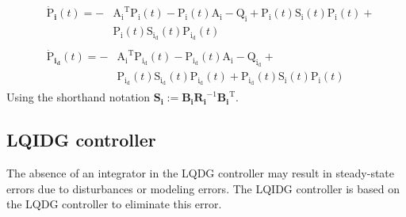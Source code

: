 \documentclass[conference]{IEEEtran}
\begin{document}
\begin{equation}\label{coupled_riccatti_LQDG}
    \begin{split}
        &\begin{split}
             \boldsymbol{\dot{\mathrm{P}}_i}(t) = -&\boldsymbol{\mathrm{A_i}}^\mathrm{T}\boldsymbol{\mathrm{P_i}}(t) - \boldsymbol{\mathrm{P_i}}(t)\boldsymbol{\mathrm{A_i}} - \boldsymbol{\mathrm{Q_i}} +\boldsymbol{\mathrm{P_i}}(t)\boldsymbol{\mathrm{S_i}}(t)\boldsymbol{\mathrm{P_i}}(t) +\\ &\boldsymbol{\mathrm{P_i}}(t)\boldsymbol{\mathrm{S_{i_d}}}(t)\boldsymbol{\mathrm{P_{i_d}}}(t)
        \end{split}\\
        &\begin{split}
            \boldsymbol{\dot{\mathrm{P}}_{i_d}}(t) = -&\boldsymbol{\mathrm{A_i}}^\mathrm{T}\boldsymbol{\mathrm{P_{i_d}}}(t) - \boldsymbol{\mathrm{P_{i_d}}}(t)\boldsymbol{\mathrm{A_i}} - \boldsymbol{\mathrm{Q_{i_d}}} +\\ & \boldsymbol{\mathrm{P_{i_d}}}(t)\boldsymbol{\mathrm{S_{i_d}}}(t)\boldsymbol{\mathrm{P_{i_d}}}(t) +\boldsymbol{\mathrm{P_{i_d}}}(t)\boldsymbol{\mathrm{S_i}}(t)\boldsymbol{\mathrm{P_i}}(t)
        \end{split}
    \end{split}
\end{equation}
Using the shorthand notation $\boldsymbol{S_i} := \boldsymbol{B_iR_{i}}^{-1}\boldsymbol{B_i}^\mathrm{T}$. %


\subsection{LQIDG controller}
The absence of an integrator in the LQDG controller may result in steady-state errors due to disturbances or modeling errors.
The LQIDG controller is based on the LQDG controller to eliminate this error.
\end{document}
